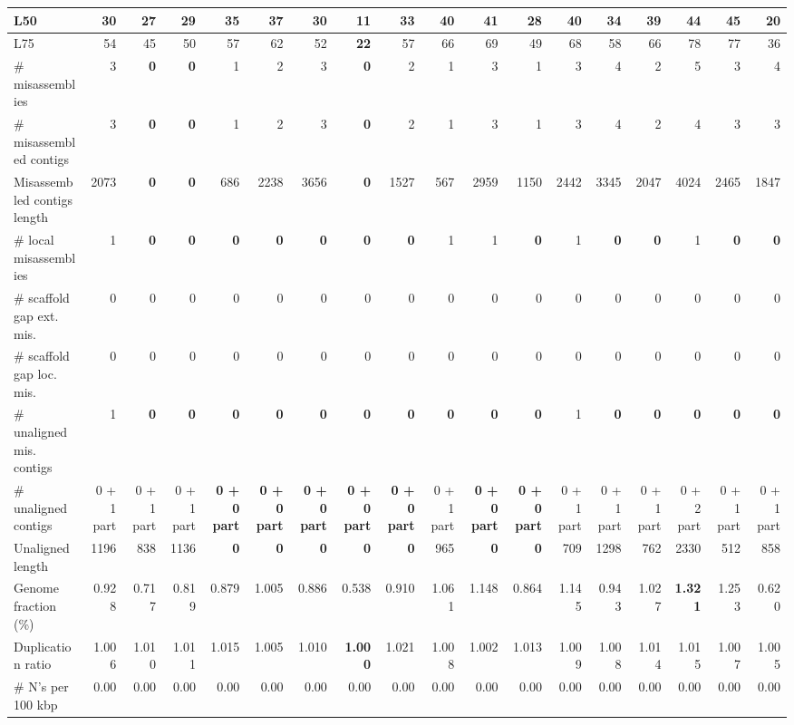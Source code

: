 \documentclass[12pt,a4paper]{article}
\begin{document}
\begin{table}[ht]
\begin{center}
\begin{tabular}{|l*{17}{|r}|}
L50 & 30 & 27 & 29 & 35 & 37 & 30 & {\bf 11} & 33 & 40 & 41 & 28 & 40 & 34 & 39 & 44 & 45 & 20 \\ \hline
L75 & 54 & 45 & 50 & 57 & 62 & 52 & {\bf 22} & 57 & 66 & 69 & 49 & 68 & 58 & 66 & 78 & 77 & 36 \\ \hline
\# misassemblies & 3 & {\bf 0} & {\bf 0} & 1 & 2 & 3 & {\bf 0} & 2 & 1 & 3 & 1 & 3 & 4 & 2 & 5 & 3 & 4 \\ \hline
\# misassembled contigs & 3 & {\bf 0} & {\bf 0} & 1 & 2 & 3 & {\bf 0} & 2 & 1 & 3 & 1 & 3 & 4 & 2 & 4 & 3 & 3 \\ \hline
Misassembled contigs length & 2073 & {\bf 0} & {\bf 0} & 686 & 2238 & 3656 & {\bf 0} & 1527 & 567 & 2959 & 1150 & 2442 & 3345 & 2047 & 4024 & 2465 & 1847 \\ \hline
\# local misassemblies & 1 & {\bf 0} & {\bf 0} & {\bf 0} & {\bf 0} & {\bf 0} & {\bf 0} & {\bf 0} & 1 & 1 & {\bf 0} & 1 & {\bf 0} & {\bf 0} & 1 & {\bf 0} & {\bf 0} \\ \hline
\# scaffold gap ext. mis. & 0 & 0 & 0 & 0 & 0 & 0 & 0 & 0 & 0 & 0 & 0 & 0 & 0 & 0 & 0 & 0 & 0 \\ \hline
\# scaffold gap loc. mis. & 0 & 0 & 0 & 0 & 0 & 0 & 0 & 0 & 0 & 0 & 0 & 0 & 0 & 0 & 0 & 0 & 0 \\ \hline
\# unaligned mis. contigs & 1 & {\bf 0} & {\bf 0} & {\bf 0} & {\bf 0} & {\bf 0} & {\bf 0} & {\bf 0} & {\bf 0} & {\bf 0} & {\bf 0} & 1 & {\bf 0} & {\bf 0} & {\bf 0} & {\bf 0} & {\bf 0} \\ \hline
\# unaligned contigs & 0 + 1 part & 0 + 1 part & 0 + 1 part & {\bf 0 + 0 part} & {\bf 0 + 0 part} & {\bf 0 + 0 part} & {\bf 0 + 0 part} & {\bf 0 + 0 part} & 0 + 1 part & {\bf 0 + 0 part} & {\bf 0 + 0 part} & 0 + 1 part & 0 + 1 part & 0 + 1 part & 0 + 2 part & 0 + 1 part & 0 + 1 part \\ \hline
Unaligned length & 1196 & 838 & 1136 & {\bf 0} & {\bf 0} & {\bf 0} & {\bf 0} & {\bf 0} & 965 & {\bf 0} & {\bf 0} & 709 & 1298 & 762 & 2330 & 512 & 858 \\ \hline
Genome fraction (\%) & 0.928 & 0.717 & 0.819 & 0.879 & 1.005 & 0.886 & 0.538 & 0.910 & 1.061 & 1.148 & 0.864 & 1.145 & 0.943 & 1.027 & {\bf 1.321} & 1.253 & 0.620 \\ \hline
Duplication ratio & 1.006 & 1.010 & 1.011 & 1.015 & 1.005 & 1.010 & {\bf 1.000} & 1.021 & 1.008 & 1.002 & 1.013 & 1.009 & 1.008 & 1.014 & 1.015 & 1.007 & 1.005 \\ \hline
\# N's per 100 kbp & 0.00 & 0.00 & 0.00 & 0.00 & 0.00 & 0.00 & 0.00 & 0.00 & 0.00 & 0.00 & 0.00 & 0.00 & 0.00 & 0.00 & 0.00 & 0.00 & 0.00 \\ \hline

\end{tabular}
\end{center}
\end{table}
\end{document}
